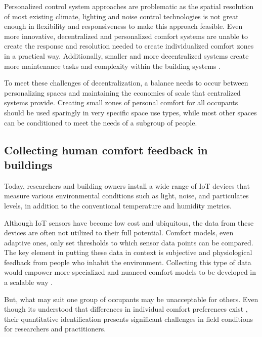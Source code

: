 \documentclass[]{interact}
\theoremstyle{plain}%
\theoremstyle{definition}
\theoremstyle{remark}
\begin{document}
Personalized control system approaches are problematic as the spatial resolution of most existing climate, lighting and noise control technologies is not great enough in flexibility and responsiveness to make this approach feasible. Even more innovative, decentralized and personalized comfort systems are unable to create the response and resolution needed to create individualized comfort zones in a practical way. Additionally, smaller and more decentralized systems create more maintenance tasks and complexity within the building systems \citep{VESELY2017223}.

To meet these challenges of decentralization, a balance needs to occur between personalizing spaces and maintaining the economies of scale that centralized systems provide. Creating small zones of personal comfort for all occupants should be used sparingly in very specific space use types, while most other spaces can be conditioned to meet the needs of a subgroup of people. 




\subsection{Collecting human comfort feedback in buildings}
Today, researchers and building owners install a wide range of IoT devices that measure various environmental conditions such as light, noise, and particulates levels, in addition to the conventional temperature and humidity metrics. 

Although IoT sensors have become low cost and ubiquitous, the data from these devices are often not utilized to their full potential. Comfort models, even adaptive ones, only set thresholds to which sensor data points can be compared. The key element in putting these data in context is subjective and physiological feedback from people who inhabit the environment. Collecting this type of data would empower more specialized and nuanced comfort models to be developed in a scalable way \cite{ltpaper}.

But, what may suit one group of occupants may be unacceptable for others. Even though its understood that differences in individual comfort preferences exist \cite{WANG2018181}, their quantitative identification presents significant challenges in field conditions for researchers and practitioners.
\end{document}
